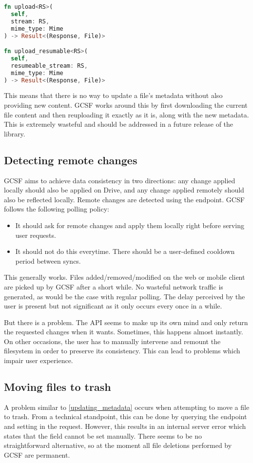 \begin{lstlisting}[language=Rust, caption=Setting file attributes, frame=single]
fn upload<RS>(
  self,
  stream: RS,
  mime_type: Mime
) -> Result<(Response, File)>

fn upload_resumable<RS>(
  self,
  resumeable_stream: RS,
  mime_type: Mime
) -> Result<(Response, File)>
\end{lstlisting}

This means that there is no way to update a file's metadata without also providing new content. GCSF works around this by first downloading the current file content and then reuploading it exactly as it is, along with the new metadata. This is extremely wasteful and should be addressed in a future release of the library.

\subsection{Detecting remote changes}

GCSF aims to achieve data consistency in two directions: any change applied locally should also be applied on Drive, and any change applied remotely should also be reflected locally. Remote changes are detected using the  endpoint. GCSF follows the following polling policy:

\begin{itemize}
  \item It should ask for remote changes and apply them locally right before serving user requests.
  \item It should not do this everytime. There should be a user-defined cooldown period between syncs.
\end{itemize}

This generally works. Files added/removed/modified on the web or mobile client are picked up by GCSF after a short while. No wasteful network traffic is generated, as would be the case with regular polling. The delay perceived by the user is present but not significant as it only occurs every once in a while.

But there is a problem. The API seems to make up its own mind and only return the requested changes when it wants. Sometimes, this happens almost instantly. On other occasions, the user has to manually intervene and remount the filesystem in order to preserve its consistency. This can lead to problems which impair user experience.

\subsection{Moving files to trash}

A problem similar to \ref{updating_metadata} occurs when attempting to move a file to trash. From a technical standpoint, this can be done by querying the  endpoint and setting  in the request. However, this results in an internal server error which states that the  field cannot be set manually. There seems to be no straightforward alternative, so at the moment all file deletions performed by GCSF are permanent.
